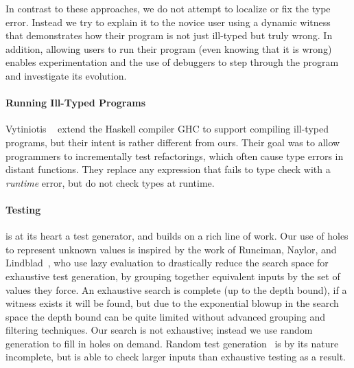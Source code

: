 In contrast to these approaches, we do not attempt to localize or fix
the type error. Instead we try to explain it to the novice user using a
dynamic witness that demonstrates how their program is not just
ill-typed but truly wrong. In addition, allowing users to run their
program (even knowing that it is wrong) enables experimentation and the
use of debuggers to step through the program and investigate its
evolution.

\paragraph{Running Ill-Typed Programs}
\label{sec:running-ill-typed}
Vytiniotis \etal~\cite{vytiniotis_equality_2012} extend the Haskell
compiler GHC to support compiling ill-typed programs, but their intent
is rather different from ours. Their goal was to allow programmers to
incrementally test refactorings, which often cause type errors in
distant functions. They replace any expression that fails to type
check with a \emph{runtime} error, but do not check types
at runtime.

\paragraph{Testing}
\label{sec:testing}
\nanomaly is at its heart a test generator, and builds on a rich line of
work.
%
Our use of holes to represent unknown values is inspired by the work of
Runciman, Naylor, and Lindblad~\cite{runciman_smallcheck_2008,naylor_finding_2007,lindblad_property_2007},
%
who use lazy evaluation to drastically reduce the search space for
exhaustive test generation, by grouping together equivalent inputs by
the set of values they force. An exhaustive search is complete (up to
the depth bound), if a witness exists it will be found, but due to the
exponential blowup in the search space the depth bound can be quite
limited without advanced grouping and filtering techniques.
%
Our search is not exhaustive; instead we use random generation to fill
in holes on demand.
%
Random test generation~\cite{claessen_quickcheck:_2000,csallner_jcrasher:_2004,pacheco_feedback-directed_2007}
%
is by its nature incomplete, but is able to check larger inputs than
exhaustive testing as a result.

